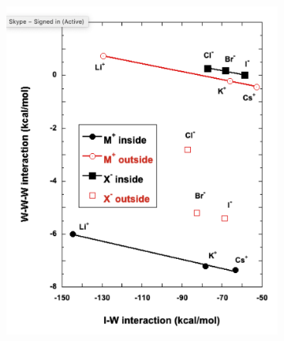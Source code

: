 \documentclass[11pt, proquest]{uwthesis}[2020/02/24]
\begin{document}
\begin{figure}
\begin{subfigure}[t]{.5\textwidth}
    \includegraphics[width=\linewidth]{Figures/Chapter_3/figure_9_tr.pdf}
  \end{subfigure}

  \medskip


\end{figure}
\end{document}
